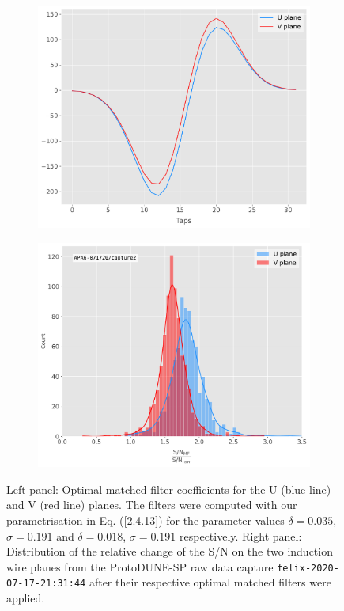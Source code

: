 \begin{figure}[t]
	\begin{subfigure}{0.5\textwidth}
		\centering
		\includegraphics[width=.99\linewidth]{Images/Matched_Filter/optimal_coeffs}
	\end{subfigure}
	\begin{subfigure}{0.5\textwidth}
		\centering
		\includegraphics[width=.99\linewidth]{Images/Matched_Filter/improvement_capture}
	\end{subfigure}
	\caption[Distribution of the relative change of the S/N on the induction planes from the ProtoDUNE-SP raw data capture after their respective optimal matched filters were applied.]{Left panel: Optimal matched filter coefficients for the U (blue line) and V (red line) planes. The filters were computed with our parametrisation in Eq. (\ref{2.4.13}) for the parameter values $\delta = 0.035$, $\sigma = 0.191$ and $\delta = 0.018$, $\sigma = 0.191$ respectively. Right panel: Distribution of the relative change of the S/N on the two induction wire planes from the ProtoDUNE-SP raw data capture \texttt{felix-2020-07-17-21:31:44} after their respective optimal matched filters were applied.}
	\label{fig:mf_perf}
\end{figure}


